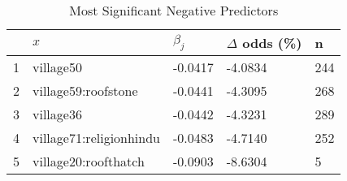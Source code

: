 \begin{table}[ht]
\centering
\begin{tabular}{rllll}
  \hline
 & $x$ & $\beta_j$ & $\Delta$ odds (\%) & n \\ 
  \hline
1 & village50 & -0.0417 & -4.0834 & 244 \\ 
  2 & village59:roofstone & -0.0441 & -4.3095 & 268 \\ 
  3 & village36 & -0.0442 & -4.3231 & 289 \\ 
  4 & village71:religionhindu & -0.0483 & -4.7140 & 252 \\ 
  5 & village20:roofthatch & -0.0903 & -8.6304 & 5 \\ 
   \hline
\end{tabular}
\caption{Most Significant Negative Predictors} 
\label{tab:neg}
\end{table}
